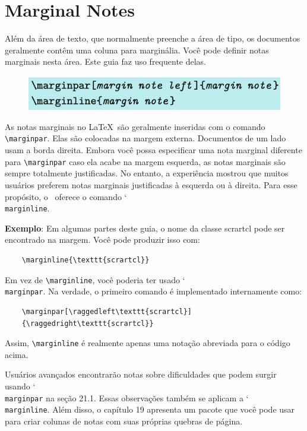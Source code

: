 \chapter{Marginal Notes}
Além da área de texto, que normalmente preenche a área de tipo, os documentos geralmente contêm uma coluna para marginália. Você pode definir notas marginais nesta área. Este guia faz uso frequente delas.

\begin{figure}[h]
    \centering
    \includegraphics[width=0.6\linewidth]{imagem25.png}
\end{figure}

As notas marginais no \LaTeX\ são geralmente inseridas com o comando \verb|\marginpar|. Elas são colocadas na margem externa. Documentos de um lado usam a borda direita. Embora você possa especificar uma nota marginal diferente para \verb|\marginpar| caso ela acabe na margem esquerda, as notas marginais são sempre totalmente justificadas. No entanto, a experiência mostrou que muitos usuários preferem notas marginais justificadas à esquerda ou à direita. Para esse propósito, o \KOMAScript\ oferece o comando \char`\\\texttt{mar\-gin\-li\-ne}.

\textbf{Exemplo}: Em algumas partes deste guia, o nome da classe scrartcl pode ser encontrado na margem. Você pode produzir isso com:
\begin{verbatim}
    \marginline{\texttt{scrartcl}}   
\end{verbatim}

Em vez de \verb|\marginline|, você poderia ter usado \char`\\\texttt{mar\-gin\-par}. Na verdade, o primeiro comando é implementado internamente como:
\begin{verbatim}
    \marginpar[\raggedleft\texttt{scrartcl}]
    {\raggedright\texttt{scrartcl}}
\end{verbatim}

Assim, \verb|\marginline| é realmente apenas uma notação abreviada para o código acima.

Usuários avançados encontrarão notas sobre dificuldades que podem surgir usando \char`\\\texttt{mar\-gin\-par} na seção 21.1. Essas observações também se aplicam a \char`\\\texttt{mar\-gin\-li\-ne}. Além disso, o capítulo 19 apresenta um pacote que você pode usar para criar colunas de notas com suas próprias quebras de página.
